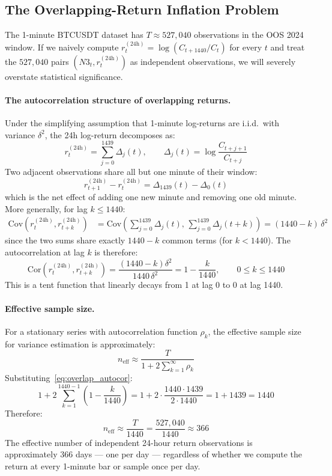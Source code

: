 \documentclass[12pt, a4paper]{article}
\theoremstyle{plain}
\theoremstyle{definition}
\newcommand{\Cov}{\mathrm{Cov}}
\newcommand{\Cor}{\mathrm{Cor}}
\begin{document}
\subsection{The Overlapping-Return Inflation Problem}
\label{sec:overlap}

The 1-minute BTCUSDT dataset has $T \approx 527{,}040$ observations in the OOS
2024 window. If we naively compute $r_t^{(24\text{h})} = \log(C_{t+1440}/C_t)$
for every $t$ and treat the $527{,}040$ pairs $(N3_t, r_t^{(24\text{h})})$ as
independent observations, we will severely overstate statistical significance.

\paragraph{The autocorrelation structure of overlapping returns.}
Under the simplifying assumption that 1-minute log-returns are i.i.d.\ with
variance $\delta^2$, the 24h log-return decomposes as:
\[
  r_t^{(24\text{h})} = \sum_{j=0}^{1439} \Delta_j(t),
  \qquad \Delta_j(t) = \log\frac{C_{t+j+1}}{C_{t+j}}
\]
Two adjacent observations share all but one minute of their window:
\[
  r_{t+1}^{(24\text{h})} - r_t^{(24\text{h})} = \Delta_{1439}(t) - \Delta_0(t)
\]
which is the net effect of adding one new minute and removing one old minute.
More generally, for lag $k \leq 1440$:
\begin{align*}
  \Cov\!\left(r_t^{(24\text{h})}, r_{t+k}^{(24\text{h})}\right)
  &= \Cov\!\left(\sum_{j=0}^{1439}\Delta_j(t),\,
                 \sum_{j=0}^{1439}\Delta_j(t+k)\right)
   = (1440 - k)\,\delta^2
\end{align*}
since the two sums share exactly $1440 - k$ common terms (for $k < 1440$).
The autocorrelation at lag $k$ is therefore:
\begin{equation}
  \Cor\!\left(r_t^{(24\text{h})}, r_{t+k}^{(24\text{h})}\right)
  = \frac{(1440 - k) \delta^2}{1440\,\delta^2}
  = 1 - \frac{k}{1440}, \qquad 0 \leq k \leq 1440
  \label{eq:overlap_autocor}
\end{equation}
This is a tent function that linearly decays from 1 at lag 0 to 0 at lag 1440.

\paragraph{Effective sample size.}
For a stationary series with autocorrelation function $\rho_k$, the effective
sample size for variance estimation is approximately:
\[
  n_{\mathrm{eff}} \approx \frac{T}{1 + 2\sum_{k=1}^{\infty} \rho_k}
\]
Substituting~\eqref{eq:overlap_autocor}:
\[
  1 + 2\sum_{k=1}^{1440-1}\!\!\left(1 - \frac{k}{1440}\right)
  = 1 + 2 \cdot \frac{1440 \cdot 1439}{2 \cdot 1440}
  = 1 + 1439
  = 1440
\]
Therefore:
\begin{equation}
  n_{\mathrm{eff}} \approx \frac{T}{1440} = \frac{527{,}040}{1440} \approx 366
  \label{eq:neff}
\end{equation}
The effective number of independent 24-hour return observations is
approximately 366 days --- one per day --- regardless of whether we
compute the return at every 1-minute bar or sample once per day.
\end{document}
